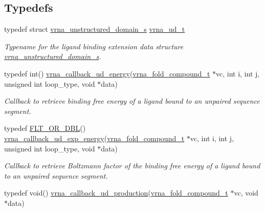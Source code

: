 \subsection*{Typedefs}
\begin{DoxyCompactItemize}
\item 
\mbox{\label{group__domains__up_ga0009117b14d29143e8b18ab891f48c2d}} 
typedef struct \mbox{\hyperlink{group__domains__up_structvrna__unstructured__domain__s}{vrna\+\_\+unstructured\+\_\+domain\+\_\+s}} \mbox{\hyperlink{group__domains__up_ga0009117b14d29143e8b18ab891f48c2d}{vrna\+\_\+ud\+\_\+t}}
\begin{DoxyCompactList}\small\item\em Typename for the ligand binding extension data structure \mbox{\hyperlink{group__domains__up_structvrna__unstructured__domain__s}{vrna\+\_\+unstructured\+\_\+domain\+\_\+s}}. \end{DoxyCompactList}\item 
typedef int() \mbox{\hyperlink{group__domains__up_ga75825c57d0bfde4ae4f95c044260c5c3}{vrna\+\_\+callback\+\_\+ud\+\_\+energy}}(\mbox{\hyperlink{group__fold__compound_ga1b0cef17fd40466cef5968eaeeff6166}{vrna\+\_\+fold\+\_\+compound\+\_\+t}} $\ast$vc, int i, int j, unsigned int loop\+\_\+type, void $\ast$data)
\begin{DoxyCompactList}\small\item\em Callback to retrieve binding free energy of a ligand bound to an unpaired sequence segment. \end{DoxyCompactList}\item 
typedef \mbox{\hyperlink{group__data__structures_ga31125aeace516926bf7f251f759b6126}{F\+L\+T\+\_\+\+O\+R\+\_\+\+D\+BL}}() \mbox{\hyperlink{group__domains__up_ga861706f257ba993753464b823e65b86e}{vrna\+\_\+callback\+\_\+ud\+\_\+exp\+\_\+energy}}(\mbox{\hyperlink{group__fold__compound_ga1b0cef17fd40466cef5968eaeeff6166}{vrna\+\_\+fold\+\_\+compound\+\_\+t}} $\ast$vc, int i, int j, unsigned int loop\+\_\+type, void $\ast$data)
\begin{DoxyCompactList}\small\item\em Callback to retrieve Boltzmann factor of the binding free energy of a ligand bound to an unpaired sequence segment. \end{DoxyCompactList}\item 
typedef void() \mbox{\hyperlink{group__domains__up_ga4fdfc02c1b660c07f2d887772f02a0a1}{vrna\+\_\+callback\+\_\+ud\+\_\+production}}(\mbox{\hyperlink{group__fold__compound_ga1b0cef17fd40466cef5968eaeeff6166}{vrna\+\_\+fold\+\_\+compound\+\_\+t}} $\ast$vc, void $\ast$data)

\end{DoxyCompactItemize}
